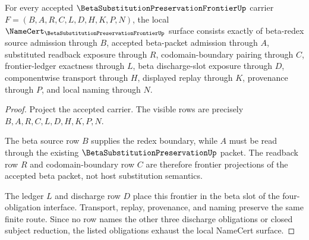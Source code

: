 \begin{theorem}
\label{thm:beta-substitution-preservation-frontier-namecert-obligations}
For every accepted $\BetaSubstitutionPreservationFrontierUp$ carrier $F=(B,A,R,C,L,D,H,K,P,N)$, the local $\NameCert_{\BetaSubstitutionPreservationFrontierUp}$ surface consists exactly of beta-redex source admission through $B$, accepted beta-packet admission through $A$, substituted readback exposure through $R$, codomain-boundary pairing through $C$, frontier-ledger exactness through $L$, beta discharge-slot exposure through $D$, componentwise transport through $H$, displayed replay through $K$, provenance through $P$, and local naming through $N$.
\end{theorem}
\begin{proof}
Project the accepted carrier. The visible rows are precisely $B,A,R,C,L,D,H,K,P,N$.

The beta source row $B$ supplies the redex boundary, while $A$ must be read through the existing $\BetaSubstitutionPreservationUp$ packet. The readback row $R$ and codomain-boundary row $C$ are therefore frontier projections of the accepted beta packet, not host substitution semantics.

The ledger $L$ and discharge row $D$ place this frontier in the beta slot of the four-obligation interface. Transport, replay, provenance, and naming preserve the same finite route. Since no row names the other three discharge obligations or closed subject reduction, the listed obligations exhaust the local NameCert surface.
\end{proof}

